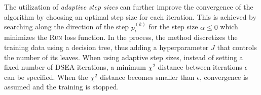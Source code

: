  \label{sec:dsea:dsea:stepsize:adaptive}
The utilization of \emph{adaptive step sizes} \cite{dsea_mirko}
can further improve the convergence of the algorithm
  by choosing an optimal step size for each iteration.
This is achieved by searching
  along the direction of the step $p_i^{(k)}$ %
  for the step size $\alpha \leq 0$
    which minimizes the \textsc{Run} \cite{milke2013} loss function.
In the process,
the method discretizes the training data
  using a decision tree,
  thus adding a hyperparameter $J$
    that controls the number of its leaves.
%
When using adaptive step sizes,
  instead of setting a fixed number of DSEA iterations,
a minimum $\chi^2$ distance between iterations $\epsilon$
can be specified.
When the $\chi^2$ distance becomes smaller than $\epsilon$,
convergence is assumed and the training is stopped.

